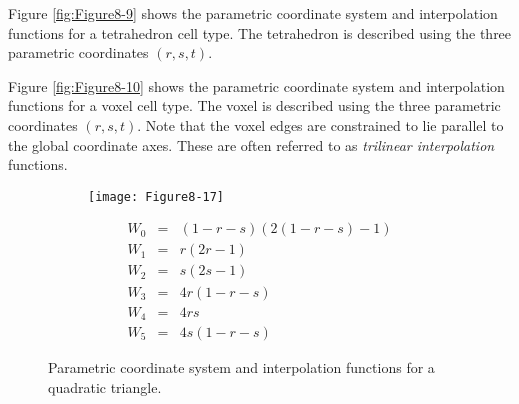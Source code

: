 \begin{description}[leftmargin=0cm,labelindent=0cm]
    \item[Tetrahedron.\index{interpolation function!tetrahedron}] Figure \ref{fig:Figure8-9} shows the parametric coordinate system and interpolation functions for a tetrahedron cell type. The tetrahedron is described using the three parametric coordinates $(r,s,t)$.

    \item[Voxel.\index{interpolation function!voxel}] Figure \ref{fig:Figure8-10} shows the parametric coordinate system and interpolation functions for a voxel cell type. The voxel is described using the three parametric coordinates $(r,s,t)$. Note that the voxel edges are constrained to lie parallel to the global coordinate axes. These are often referred to as \emph{trilinear interpolation} functions.

    \begin{figure}[!htb]
        \centering
        \begin{subfigure}{0.48\linewidth}
            \centering
            \texttt{[image: Figure8-17]}
            \caption*{}
        \end{subfigure}
        \hfill
        \begin{subfigure}{0.48\linewidth}
            \centering
            \begin{equation*}
            \begin{array}{lll}
            W_0 &=& (1 - r - s)(2(1 - r - s) - 1) \\
            W_1 &=& r (2 r - 1) \\
            W_2 &=& s(2s - 1) \\
            W_3 &=& 4 r (1 - r - s) \\
            W_4 &=& 4 r s \\
            W_5 &=& 4 s (1 - r - s)
            \end{array}
            \end{equation*}
        \end{subfigure}%
        \caption{Parametric coordinate system and interpolation functions for a quadratic triangle.}
        \label{fig:Figure8-17}
    \end{figure}


\end{description}
